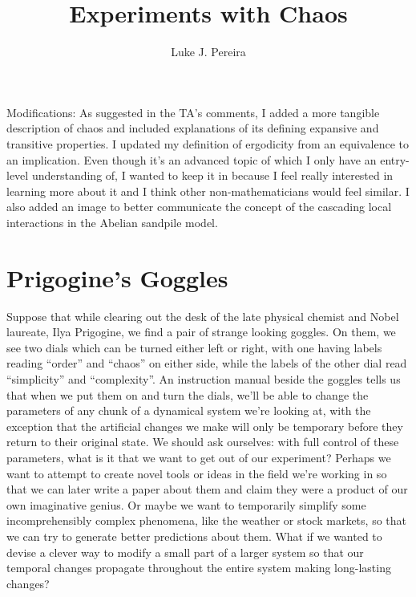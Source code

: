 \documentclass{article}
\title{\vspace{-3cm} Experiments with Chaos}
\author{Luke J. Pereira}
\date{}
\begin{document}
\maketitle
Modifications:
As suggested in the TA's comments, I added a more tangible description of chaos and included explanations of its defining expansive and transitive properties. I updated my definition of ergodicity from an equivalence to an implication. Even though it's an advanced topic of which I only have an entry-level understanding of, I wanted to keep it in because I feel really interested in learning more about it and I think other non-mathematicians would feel similar. I also added an image to better communicate the concept of the cascading local interactions in the Abelian sandpile model.

\section{Prigogine's Goggles}
Suppose that while clearing out the desk of the late physical chemist and Nobel laureate, Ilya Prigogine, we find a pair of strange looking goggles. On them, we see two dials which can be turned either left or right, with one having labels reading ``order'' and ``chaos'' on either side, while the labels of the other dial read ``simplicity'' and ``complexity''. An instruction manual beside the goggles tells us that when we put them on and turn the dials, we'll be able to change the parameters of any chunk of a dynamical system we're looking at, with the exception that the artificial changes we make will only be temporary before they return to their original state. We should ask ourselves: with full control of these parameters, what is it that we want to get out of our experiment? Perhaps we want to attempt to create novel tools or ideas in the field we're working in so that we can later write a paper about them and claim they were a product of our own imaginative genius. Or maybe we want to temporarily simplify some incomprehensibly complex phenomena, like the weather or stock markets, so that we can try to generate better predictions about them. What if we wanted to devise a clever way to modify a small part of a larger system so that our temporal changes propagate throughout the entire system making long-lasting changes? 
\end{document}
